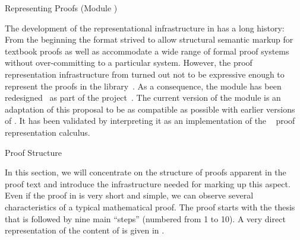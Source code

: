 \begin{omgroup}[id=proofs,short=Representing Proofs]{Representing Proofs (Module {})}
\begin{module}[id=proofs-intro]
The development of the representational infrastructure in {\omdoc} has a long history:
From the beginning the format strived to allow structural semantic markup for textbook
proofs as well as accommodate a wide range of formal proof systems without over-committing
to a particular system. However, the proof representation infrastructure from
{} turned out not to be expressive enough to represent the proofs in the
{} library~\cite{AspPad:hsmw01}. As a consequence, the {} module
has been redesigned~\cite{AspKohSac:dtdop03} as part of the {}
project~\cite{AspKoht:mimp02}.  The current version of the {} module is an
adaptation of this proposal to be as compatible as possible with earlier versions of
{\omdoc}. It has been validated by interpreting it as an implementation of the
{}~\cite{SacerdotiCoen:enlt05} proof
representation calculus.
\end{module}


\begin{module}[id=proof-structure]
\begin{omgroup}[id=proof-text]{Proof Structure}

In this section, we will concentrate on the structure of proofs apparent in the proof text
and introduce the {\omdoc} infrastructure needed for marking up this aspect. Even if the
proof in {} is very short and simple, we can observe several
characteristics of a typical mathematical proof.  The proof starts with the thesis that is
followed by nine main ``steps'' (numbered from 1 to 10). A very direct representation of
the content of {} is given in {}.


\end{omgroup}
\end{module}
\end{omgroup}
